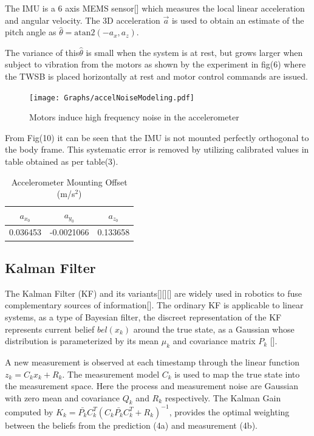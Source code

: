         The IMU is a 6 axis MEMS sensor[] which measures the local linear acceleration 
        and angular velocity.
        The 3D acceleration $\vec{a}$ is used to obtain an 
        estimate of the pitch angle as $\hat{\theta} = \mathrm{atan2}\left(-a_x ,a_z \right)$. 

        The variance of this$\hat{\theta}$ is small when the system is at rest, but grows larger when subject to vibration from the motors
        as shown by the experiment in fig(6) where the TWSB is placed horizontally at rest and motor control commands are issued. 
        \begin{figure}[H]
            \centering
            \texttt{[image: Graphs/accelNoiseModeling.pdf]}
            \caption{Motors induce high frequency noise in the accelerometer}
        \end{figure}

        From Fig(10) it can be seen that the IMU is not mounted perfectly orthogonal to the body frame. 
        This systematic error is removed by utilizing calibrated values in table obtained as per table(3).

        \begin{table}[H]
            \centering
            \begin{tabular}{c c c} 
                \toprule
                $a_{x_0}$ & $a_{y_0}$ & $a_{z_0}$ \\
                \midrule
                0.036453 & -0.0021066 & 0.133658 \\
                \bottomrule
            \end{tabular}
            \caption{Accelerometer Mounting Offset (m/s$^{2}$)}
        \end{table}
        
        
        \pagebreak{}
        \subsection{Kalman Filter}
        The Kalman Filter (KF) and its variants[][][] are widely used in robotics to fuse 
        complementary sources of information[]. 
        The ordinary KF is applicable to linear systems, as a type of Bayesian filter, 
        the discreet representation of the KF represents current belief $bel(x_k)$ around the true state,
        as a Gaussian whose distribution is parameterized by its mean $\mu_k$ and covariance matrix $P_k$ []. 

        A new measurement is observed at each timestamp through the linear function $z_k = C_k x_k + R_k$. 
        The measurement model $C_k$ is used to map the true state into the measurement space.
        Here the process and measurement noise are Gaussian with zero mean and covariance $Q_k$ and $R_k$ respectively. 
        The Kalman Gain computed by $ K_k = \bar{P_k} C_k^T \left(C_k \bar{P_k} C_k^T + R_k \right)^{-1}$, 
        provides the optimal weighting between the beliefs from the prediction (4a) and measurement (4b). 
     
